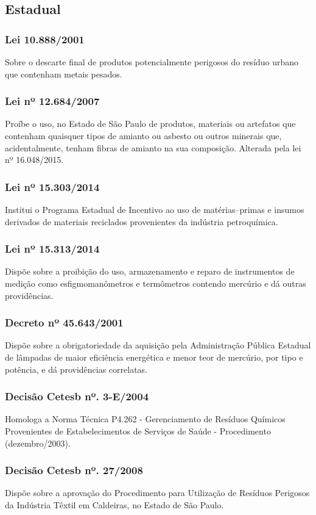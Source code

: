 \begin{subapend}
	\subsection{Estadual}
	\begin{subsubapend}
		\subsubsection{Lei 10.888/2001}
		Sobre o descarte final de produtos potencialmente perigosos do resíduo urbano que contenham metais pesados.
		\subsubsection{Lei nº 12.684/2007}
		Proíbe o uso, no Estado de São Paulo de produtos, materiais ou artefatos que contenham quaisquer tipos de amianto ou asbesto ou outros minerais que, acidentalmente, tenham fibras de amianto na sua composição. Alterada pela lei nº 16.048/2015.
		\subsubsection{Lei nº 15.303/2014}
		Institui o Programa Estadual de Incentivo ao uso de matérias–primas e insumos derivados de materiais reciclados provenientes da indústria petroquímica.
		\subsubsection{Lei nº 15.313/2014}
		Dispõe sobre a proibição do uso, armazenamento e reparo de instrumentos de medição como esfigmomanômetros e termômetros contendo mercúrio e dá outras providências.
		\subsubsection{Decreto nº 45.643/2001}
		Dispõe sobre a obrigatoriedade da aquisição pela Administração Pública Estadual de lâmpadas de maior eficiência energética e menor teor de mercúrio, por tipo e potência, e dá providências correlatas.
		\subsubsection{Decisão Cetesb nº. 3-E/2004}
		Homologa a Norma Técnica P4.262 - Gerenciamento de Resíduos Químicos Provenientes de Estabelecimentos de Serviços de Saúde - Procedimento (dezembro/2003).
		\subsubsection{Decisão Cetesb nº. 27/2008}
		Dispõe sobre a aprovação do Procedimento para Utilização de Resíduos Perigosos da Indústria Têxtil em Caldeiras, no Estado de São Paulo.

\end{subsubapend}
\end{subapend}

